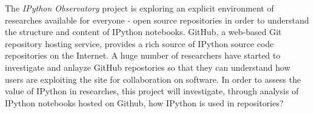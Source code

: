 The \textit{IPython Observatory} project is exploring an explicit environment of researches available for everyone - open source repositories in order to understand the structure and content of IPython notebooks. GitHub, a web-based Git repository hosting service, provides a rich source of IPython source code repositories on the Internet.\cite{gitHubWiki} A huge number of researchers have started to investigate and anlayze GitHub repostories so that they can understand how users are exploiting the site for collaboration on software. \cite{kalliamvakou2007promises} In order to assess the value of IPython in researches, this project will investigate, through analysis of IPython notebooks hosted on Github, how IPython is used in repositories?

